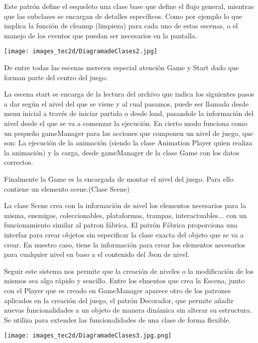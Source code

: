\documentclass[12pt,a4paper,twoside,spanish]{article}      %
\begin{document}
 Este patrón define el esqueleto  una clase base que define el flujo general, mientras que las subclases se encargan de detalles específicos. Como por ejemplo lo que implica la función de cleanup (limpieza) para cada uno de estas escenas, o el manejo de los eventos que puedan ser necesarios en la pantalla.

\begin{center}
    \texttt{[image: images\_tec2d/DiagramadeClases2.jpg]}
\end{center}

De entre todas las escenas merecen especial atención Game y Start dado que forman parte del centro del juego.

La escena start se encarga de la lectura del archivo que indica los siguientes pasos a dar según el nivel del que se viene y al cual pasamos, puede ser llamada desde menu inicial a través de iniciar partida o desde load, pasandole la información del nivel desde el que se va a comenzar la ejecución. En cierto modo funciona como un pequeño gameManager para las acciones que componen un nivel de juego, que son:
La ejecución de la animación (siendo la clase Animation Player quien realiza la animación)  
y la carga, desde gameManager de la clase Game con los datos correctos.

Finalmente la Game es la encargada de montar el nivel del juego.
Para ello contiene un elemento scene.(Clase Scene)

La clase Scene crea con la información de nivel los elementos necesarios para la misma, enemigos, coleccionables, plataformas, trampas, interactuables... con un funcionamiento similar al patron fábrica. El patrón Fábrica proporciona una interfaz para crear objetos sin especificar la clase exacta del objeto que se va a crear.  En nuestro caso, tiene la información para crear los elementos necesarios para cualquier nivel en baso a el contenido del Json de nivel.

Seguir este sistema nos permite que la creación de niveles o la modificación de los mismos sea algo rápido y sencillo.
Entre los elmentos que crea la Escena, junto con el Player que es creado en GameManager aparece otro de los patrones aplicados en la creación del juego, el patrón Decorador, que permite añadir nuevas funcionalidades a un objeto de manera dinámica sin alterar su estructura. Se utiliza para extender las funcionalidades de una clase de forma flexible.

\begin{center}
    \texttt{[image: images\_tec2d/DiagramadeClases3.jpg.png]}
\end{center}
\end{document}

